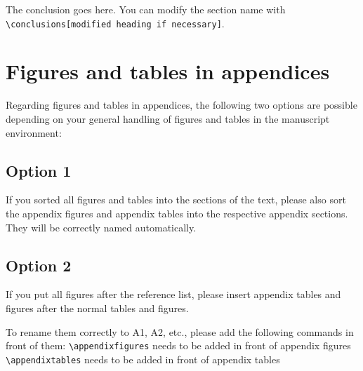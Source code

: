 \documentclass[gc, manuscript]{copernicus}
\begin{document}
\conclusions[Conclusions]

The conclusion goes here. You can modify the section name with
\texttt{\textbackslash{}conclusions{[}modified\ heading\ if\ necessary{]}}.







\appendix
\section{Figures and tables in appendices}

Regarding figures and tables in appendices, the following two options
are possible depending on your general handling of figures and tables in
the manuscript environment:

\subsection{Option 1}

If you sorted all figures and tables into the sections of the text,
please also sort the appendix figures and appendix tables into the
respective appendix sections. They will be correctly named
automatically.

\subsection{Option 2}

If you put all figures after the reference list, please insert appendix
tables and figures after the normal tables and figures.

To rename them correctly to A1, A2, etc., please add the following
commands in front of them: \texttt{\textbackslash{}appendixfigures}
needs to be added in front of appendix figures
\texttt{\textbackslash{}appendixtables} needs to be added in front of
appendix tables
\end{document}
